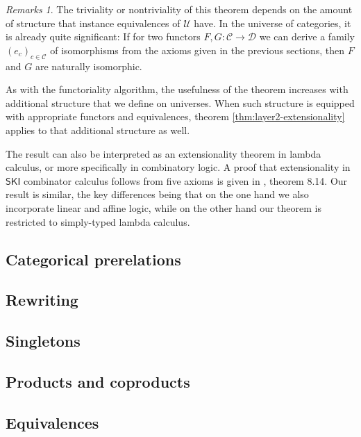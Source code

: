 \documentclass[a4paper]{article}
\theoremstyle{definition}
\theoremstyle{remark}
\newtheorem*{remarks}{Remarks}
\renewcommand{\equiv}{\simeq}
\newcommand{\C}{\mathcal{C}}
\newcommand{\D}{\mathcal{D}}
\newcommand{\U}{\mathcal{U}}
\newcommand{\V}{\mathcal{V}}
\newcommand{\nm}{\mathsf}
\begin{document}
\begin{remarks}
  The triviality or nontriviality of this theorem depends on the amount of structure
  that instance equivalences of $\U$ have. In the universe of categories, it is
  already quite significant: If for two functors $F,G : \C \to \D$ we can derive a
  family $(e_c)_{c \in \C}$ of isomorphisms from the axioms given in the previous
  sections, then $F$ and $G$ are naturally isomorphic.

  As with the functoriality algorithm, the usefulness of the theorem increases with
  additional structure that we define on universes. When such structure is equipped
  with appropriate functors and equivalences, theorem \ref{thm:layer2-extensionality}
  applies to that additional structure as well.

  The result can also be interpreted as an extensionality theorem in lambda calculus,
  or more specifically in combinatory logic. A proof that extensionality in $\nm{SKI}$
  combinator calculus follows from five axioms is given in \cite{hindley-seldin},
  theorem 8.14. Our result is similar, the key differences being that on the one hand we also
  incorporate linear and affine logic, while on the other hand our theorem is restricted to
  simply-typed lambda calculus.
\end{remarks}


\subsection{Categorical prerelations}

\subsection{Rewriting}


\subsection{Singletons}

\subsection{Products and coproducts}

\subsection{Equivalences}
\end{document}
